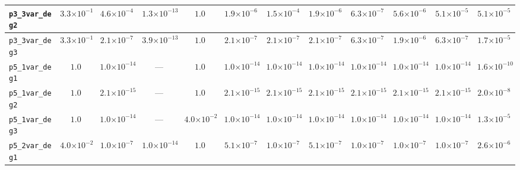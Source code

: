 \begin{landscape}
\begin{table}[H]
{\begin{tabular}{lccccccccccc}
\hline
\texttt{p3\_3var\_deg2} & $3.3{\scriptstyle\times 10^{-1}}$ & $4.6{\scriptstyle\times 10^{-4}}$ & \textbf{$1.3{\scriptstyle\times 10^{-13}}$} & $1.0$ & $1.9{\scriptstyle\times 10^{-6}}$ & $1.5{\scriptstyle\times 10^{-4}}$ & $1.9{\scriptstyle\times 10^{-6}}$ & $6.3{\scriptstyle\times 10^{-7}}$ & $5.6{\scriptstyle\times 10^{-6}}$ & $5.1{\scriptstyle\times 10^{-5}}$ & $5.1{\scriptstyle\times 10^{-5}}$ \\
\hline
\texttt{p3\_3var\_deg3} & $3.3{\scriptstyle\times 10^{-1}}$ & $2.1{\scriptstyle\times 10^{-7}}$ & \textbf{$3.9{\scriptstyle\times 10^{-13}}$} & $1.0$ & $2.1{\scriptstyle\times 10^{-7}}$ & $2.1{\scriptstyle\times 10^{-7}}$ & $2.1{\scriptstyle\times 10^{-7}}$ & $6.3{\scriptstyle\times 10^{-7}}$ & $1.9{\scriptstyle\times 10^{-6}}$ & $6.3{\scriptstyle\times 10^{-7}}$ & $1.7{\scriptstyle\times 10^{-5}}$ \\
\hline
\texttt{p5\_1var\_deg1} & $1.0$ & \textbf{$1.0{\scriptstyle\times 10^{-14}}$} & --- & $1.0$ & \textbf{$1.0{\scriptstyle\times 10^{-14}}$} & \textbf{$1.0{\scriptstyle\times 10^{-14}}$} & \textbf{$1.0{\scriptstyle\times 10^{-14}}$} & \textbf{$1.0{\scriptstyle\times 10^{-14}}$} & \textbf{$1.0{\scriptstyle\times 10^{-14}}$} & \textbf{$1.0{\scriptstyle\times 10^{-14}}$} & $1.6{\scriptstyle\times 10^{-10}}$ \\
\hline
\texttt{p5\_1var\_deg2} & $1.0$ & \textbf{$2.1{\scriptstyle\times 10^{-15}}$} & --- & $1.0$ & \textbf{$2.1{\scriptstyle\times 10^{-15}}$} & \textbf{$2.1{\scriptstyle\times 10^{-15}}$} & \textbf{$2.1{\scriptstyle\times 10^{-15}}$} & \textbf{$2.1{\scriptstyle\times 10^{-15}}$} & \textbf{$2.1{\scriptstyle\times 10^{-15}}$} & \textbf{$2.1{\scriptstyle\times 10^{-15}}$} & $2.0{\scriptstyle\times 10^{-8}}$ \\
\hline
\texttt{p5\_1var\_deg3} & $1.0$ & \textbf{$1.0{\scriptstyle\times 10^{-14}}$} & --- & $4.0{\scriptstyle\times 10^{-2}}$ & \textbf{$1.0{\scriptstyle\times 10^{-14}}$} & \textbf{$1.0{\scriptstyle\times 10^{-14}}$} & \textbf{$1.0{\scriptstyle\times 10^{-14}}$} & \textbf{$1.0{\scriptstyle\times 10^{-14}}$} & \textbf{$1.0{\scriptstyle\times 10^{-14}}$} & \textbf{$1.0{\scriptstyle\times 10^{-14}}$} & $1.3{\scriptstyle\times 10^{-5}}$ \\
\hline
\texttt{p5\_2var\_deg1} & $4.0{\scriptstyle\times 10^{-2}}$ & $1.0{\scriptstyle\times 10^{-7}}$ & \textbf{$1.0{\scriptstyle\times 10^{-14}}$} & $1.0$ & $5.1{\scriptstyle\times 10^{-7}}$ & $1.0{\scriptstyle\times 10^{-7}}$ & $5.1{\scriptstyle\times 10^{-7}}$ & $1.0{\scriptstyle\times 10^{-7}}$ & $1.0{\scriptstyle\times 10^{-7}}$ & $1.0{\scriptstyle\times 10^{-7}}$ & $2.6{\scriptstyle\times 10^{-6}}$ \\

\end{tabular}}
\end{table}
\end{landscape}
